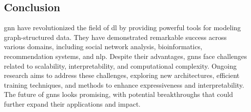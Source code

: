 \subsection*{Conclusion}

\acrlong{gnn} have revolutionized the field of \acrlong{dl} by providing powerful tools for modeling graph-structured data. They have demonstrated remarkable success across various domains, including social network analysis, bioinformatics, recommendation systems, and \gls{nlp}. Despite their advantages, \glspl{gnn} face challenges related to scalability, interpretability, and computational complexity. Ongoing research aims to address these challenges, exploring new architectures, efficient training techniques, and methods to enhance expressiveness and interpretability. The future of \glspl{gnn} looks promising, with potential breakthroughs that could further expand their applications and impact.
